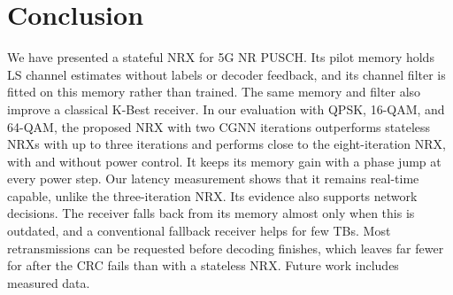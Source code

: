 \section{Conclusion}
We have presented a stateful NRX for 5G NR PUSCH. Its pilot memory holds LS channel estimates without labels or decoder feedback, and its channel filter is fitted on this memory rather than trained. The same memory and filter also improve a classical K-Best receiver. In our evaluation with QPSK, 16-QAM, and 64-QAM, the proposed NRX with two CGNN iterations outperforms stateless NRXs with up to three iterations and performs close to the eight-iteration NRX, with and without power control. It keeps its memory gain with a phase jump at every power step. Our latency measurement shows that it remains real-time capable, unlike the three-iteration NRX. Its evidence also supports network decisions. The receiver falls back from its memory almost only when this is outdated, and a conventional fallback receiver helps for few TBs. Most retransmissions can be requested before decoding finishes, which leaves far fewer for after the CRC fails than with a stateless NRX. Future work includes measured data.
